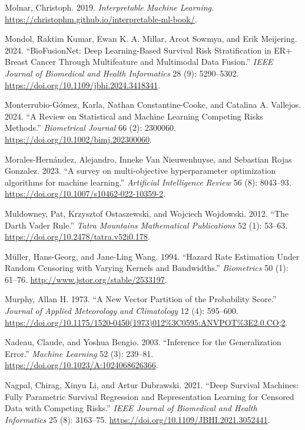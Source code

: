\documentclass[
  letterpaper,
  krantz2]{style/krantz}
\newlength{\cslhangindent}
\newenvironment{CSLReferences}[2] %
 {\begin{list}{}{%
  \setlength{\itemindent}{0pt}
  \setlength{\leftmargin}{0pt}
  \setlength{\parsep}{0pt}
  \ifodd #1
   \setlength{\leftmargin}{\cslhangindent}
   \setlength{\itemindent}{-1\cslhangindent}
  \fi
  \setlength{\itemsep}{#2\baselineskip}}}
 {\end{list}}
\begin{document}
\begin{CSLReferences}{1}{0}
Molnar, Christoph. 2019. \emph{{Interpretable Machine Learning}}.
\url{https://christophm.github.io/interpretable-ml-book/}.

Mondol, Raktim Kumar, Ewan K. A. Millar, Arcot Sowmya, and Erik
Meijering. 2024. {``BioFusionNet: Deep Learning-Based Survival Risk
Stratification in ER+ Breast Cancer Through Multifeature and Multimodal
Data Fusion.''} \emph{IEEE Journal of Biomedical and Health Informatics}
28 (9): 5290--5302. \url{https://doi.org/10.1109/jbhi.2024.3418341}.

Monterrubio-Gómez, Karla, Nathan Constantine-Cooke, and Catalina A.
Vallejos. 2024. {``A Review on Statistical and Machine Learning
Competing Risks Methods.''} \emph{Biometrical Journal} 66 (2): 2300060.
\url{https://doi.org/10.1002/bimj.202300060}.

Morales-Hernández, Alejandro, Inneke Van Nieuwenhuyse, and Sebastian
Rojas Gonzalez. 2023. {``{A survey on multi-objective hyperparameter
optimization algorithms for machine learning}.''} \emph{Artificial
Intelligence Review} 56 (8): 8043--93.
\url{https://doi.org/10.1007/s10462-022-10359-2}.

Muldowney, Pat, Krzysztof Ostaszewski, and Wojciech Wojdowski. 2012.
{``The Darth Vader Rule.''} \emph{Tatra Mountains Mathematical
Publications} 52 (1): 53--63.
\url{https://doi.org/10.2478/tatra.v52i0.178}.

Müller, Hans-Georg, and Jane-Ling Wang. 1994. {``Hazard Rate Estimation
Under Random Censoring with Varying Kernels and Bandwidths.''}
\emph{Biometrics} 50 (1): 61--76.
\url{http://www.jstor.org/stable/2533197}.

Murphy, Allan H. 1973. {``{A New Vector Partition of the Probability
Score}.''} \emph{Journal of Applied Meteorology and Climatology} 12 (4):
595--600.
\url{https://doi.org/10.1175/1520-0450(1973)012\%3C0595:ANVPOT\%3E2.0.CO;2}.

Nadeau, Claude, and Yoshua Bengio. 2003. {``{Inference for the
Generalization Error}.''} \emph{Machine Learning} 52 (3): 239--81.
\url{https://doi.org/10.1023/A:1024068626366}.

Nagpal, Chirag, Xinyu Li, and Artur Dubrawski. 2021. {``{Deep Survival
Machines: Fully Parametric Survival Regression and Representation
Learning for Censored Data with Competing Risks}.''} \emph{IEEE Journal
of Biomedical and Health Informatics} 25 (8): 3163--75.
\url{https://doi.org/10.1109/JBHI.2021.3052441}.


\end{CSLReferences}
\end{document}
